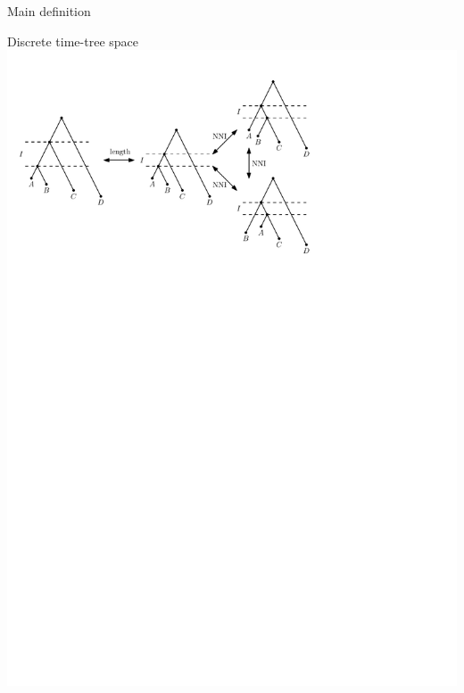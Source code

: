 \documentclass{beamer}
\theoremstyle{example}
\begin{document}
\begin{frame}{Main definition}
\begin{block}{Discrete time-tree space}
\includegraphics[width=\framewidth]{DtT}
\end{block}
\end{frame}
\end{document}
